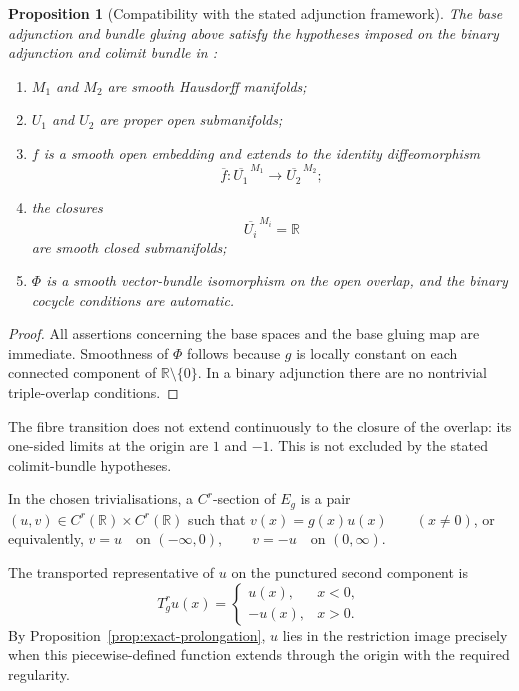 \documentclass[11pt]{article}
\theoremstyle{plain}
\newtheorem{proposition}[theorem]{Proposition}
\theoremstyle{definition}
\begin{document}
\begin{proposition}[Compatibility with the stated adjunction framework]
\label{prop:sign-example-hypotheses}
The base adjunction and bundle gluing above satisfy the hypotheses
imposed on the binary adjunction and colimit bundle in
\citep{OConnell2024Bundles}:

\begin{enumerate}[label=\textup{(\roman*)}]
  \item \(M_1\) and \(M_2\) are smooth Hausdorff manifolds;

  \item \(U_1\) and \(U_2\) are proper open submanifolds;

  \item \(f\) is a smooth open embedding and extends to the identity
        diffeomorphism
        \[
          \overline f:
          \overline{U_1}^{\,M_1}
          \longrightarrow
          \overline{U_2}^{\,M_2};
        \]

  \item the closures
        \[
          \overline{U_i}^{\,M_i}
          =
          \mathbb R
        \]
        are smooth closed submanifolds;

  \item \(\Phi\) is a smooth vector-bundle isomorphism on the open
        overlap, and the binary cocycle conditions are automatic.
\end{enumerate}
\end{proposition}

\begin{proof}
All assertions concerning the base spaces and the base gluing map are
immediate. Smoothness of \(\Phi\) follows because \(g\) is locally
constant on each connected component of
\(\mathbb R\setminus\{0\}\). In a binary adjunction there are no
nontrivial triple-overlap conditions.
\end{proof}

The fibre transition does not extend continuously to the closure of
the overlap: its one-sided limits at the origin are \(1\) and \(-1\).
This is not excluded by the stated colimit-bundle hypotheses.

In the chosen trivialisations, a \(C^r\)-section of \(E_g\) is a pair \((u,v) \in C^r(\mathbb R)\times C^r(\mathbb R)\) such that
\(v(x)=g(x)u(x) \qquad (x\neq0)\),
or equivalently,
\(v=u \quad\text{on }(-\infty,0), \qquad v=-u \quad\text{on }(0,\infty)\).

The transported representative of \(u\) on the punctured second
component is
\[
  T_g^r u(x)
  =
  \begin{cases}
    u(x),&x<0,\\
    -u(x),&x>0.
  \end{cases}
\]
By Proposition~\ref{prop:exact-prolongation}, \(u\) lies in the
restriction image precisely when this piecewise-defined function
extends through the origin with the required regularity.
\end{document}
